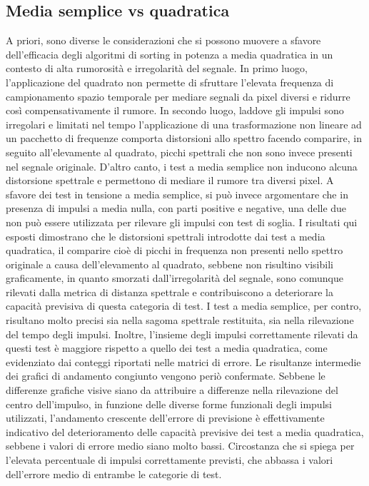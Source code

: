 \documentclass[9pt,twocolumn,twoside]{osajnl}
\begin{document}
\subsection{Media semplice vs quadratica}
A priori, sono diverse le considerazioni che si possono muovere a sfavore dell'efficacia degli algoritmi di sorting in potenza a media quadratica in un contesto di alta rumorosità e irregolarità del segnale. In primo luogo, l'applicazione del quadrato non permette di sfruttare l'elevata frequenza di campionamento spazio temporale per mediare segnali da pixel diversi e ridurre così compensativamente il rumore. In secondo luogo, laddove gli impulsi sono irregolari e limitati nel tempo l'applicazione di una trasformazione non lineare ad un pacchetto di frequenze comporta distorsioni allo spettro facendo comparire, in seguito all'elevamente al quadrato, picchi spettrali che non sono invece presenti nel segnale originale. D'altro canto, i test a media semplice non inducono alcuna distorsione spettrale e permettono di mediare il rumore tra diversi pixel. A sfavore dei test in tensione a media semplice, si può invece argomentare che in presenza di impulsi a media nulla, con parti positive e negative, una delle due non può essere utilizzata per rilevare gli impulsi con test di soglia.
%
I risultati qui esposti dimostrano che le distorsioni spettrali introdotte dai test a media quadratica, il comparire cioè di picchi in frequenza non presenti nello spettro originale a causa dell'elevamento al quadrato, sebbene non risultino visibili graficamente, in quanto smorzati dall'irregolarità del segnale, sono comunque rilevati dalla metrica di distanza spettrale e contribuiscono a deteriorare la capacità previsiva di questa categoria di test.
%
I test a media semplice, per contro, risultano molto precisi sia nella sagoma spettrale restituita, sia nella rilevazione del tempo degli impulsi. Inoltre, l'insieme degli impulsi correttamente rilevati da questi test è maggiore rispetto a quello dei test a media quadratica, come evidenziato dai conteggi riportati nelle matrici di errore.
%
Le risultanze intermedie dei grafici di andamento congiunto vengono periò confermate. Sebbene le differenze grafiche visive siano da attribuire a differenze nella rilevazione del centro dell'impulso, in funzione delle diverse forme funzionali degli impulsi utilizzati, l'andamento crescente dell'errore di previsione è effettivamente indicativo del deterioramento delle capacità previsive dei test a media quadratica, sebbene i valori di errore medio siano molto bassi. Circostanza che si spiega per l'elevata percentuale di impulsi correttamente previsti, che abbassa i valori dell'errore medio di entrambe le categorie di test.
\end{document}
